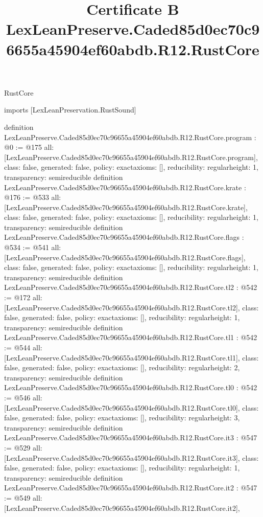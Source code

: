 \begin{lexlean}{RustCore}
\title{Certificate B LexLeanPreserve.Caded85d0ec70c96655a45904ef60abdb.R12.RustCore}
\begin{coremodule}
imports [LexLeanPreservation.RustSound]

definition LexLeanPreserve.Caded85d0ec70c96655a45904ef60abdb.R12.RustCore.program : @0 := @175 {
  all: [LexLeanPreserve.Caded85d0ec70c96655a45904ef60abdb.R12.RustCore.program],
  class: false,
  generated: false,
  policy: exact{axioms: []},
  reducibility: regular{height: 1},
  transparency: semireducible
}
definition LexLeanPreserve.Caded85d0ec70c96655a45904ef60abdb.R12.RustCore.krate : @176 := @533 {
  all: [LexLeanPreserve.Caded85d0ec70c96655a45904ef60abdb.R12.RustCore.krate],
  class: false,
  generated: false,
  policy: exact{axioms: []},
  reducibility: regular{height: 1},
  transparency: semireducible
}
definition LexLeanPreserve.Caded85d0ec70c96655a45904ef60abdb.R12.RustCore.flags : @534 := @541 {
  all: [LexLeanPreserve.Caded85d0ec70c96655a45904ef60abdb.R12.RustCore.flags],
  class: false,
  generated: false,
  policy: exact{axioms: []},
  reducibility: regular{height: 1},
  transparency: semireducible
}
definition LexLeanPreserve.Caded85d0ec70c96655a45904ef60abdb.R12.RustCore.tl2 : @542 := @172 {
  all: [LexLeanPreserve.Caded85d0ec70c96655a45904ef60abdb.R12.RustCore.tl2],
  class: false,
  generated: false,
  policy: exact{axioms: []},
  reducibility: regular{height: 1},
  transparency: semireducible
}
definition LexLeanPreserve.Caded85d0ec70c96655a45904ef60abdb.R12.RustCore.tl1 : @542 := @544 {
  all: [LexLeanPreserve.Caded85d0ec70c96655a45904ef60abdb.R12.RustCore.tl1],
  class: false,
  generated: false,
  policy: exact{axioms: []},
  reducibility: regular{height: 2},
  transparency: semireducible
}
definition LexLeanPreserve.Caded85d0ec70c96655a45904ef60abdb.R12.RustCore.tl0 : @542 := @546 {
  all: [LexLeanPreserve.Caded85d0ec70c96655a45904ef60abdb.R12.RustCore.tl0],
  class: false,
  generated: false,
  policy: exact{axioms: []},
  reducibility: regular{height: 3},
  transparency: semireducible
}
definition LexLeanPreserve.Caded85d0ec70c96655a45904ef60abdb.R12.RustCore.it3 : @547 := @529 {
  all: [LexLeanPreserve.Caded85d0ec70c96655a45904ef60abdb.R12.RustCore.it3],
  class: false,
  generated: false,
  policy: exact{axioms: []},
  reducibility: regular{height: 1},
  transparency: semireducible
}
definition LexLeanPreserve.Caded85d0ec70c96655a45904ef60abdb.R12.RustCore.it2 : @547 := @549 {
  all: [LexLeanPreserve.Caded85d0ec70c96655a45904ef60abdb.R12.RustCore.it2],
}
\end{coremodule}
\end{lexlean}
